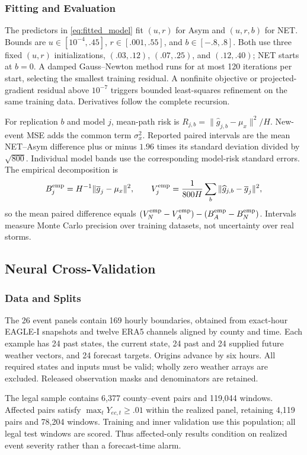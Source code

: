 \subsubsection{Fitting and Evaluation}
The predictors in \eqref{eq:fitted_model} fit $(u,r)$ for Asym and $(u,r,b)$ for NET. Bounds are $u\in[10^{-4},.45]$, $r\in[.001,.55]$, and $b\in[-.8,.8]$. Both use three fixed $(u,r)$ initializations, $(.03,.12)$, $(.07,.25)$, and $(.12,.40)$; NET starts at $b=0$. A damped Gauss--Newton method runs for at most 120 iterations per start, selecting the smallest training residual. A nonfinite objective or projected-gradient residual above $10^{-7}$ triggers bounded least-squares refinement on the same training data. Derivatives follow the complete recursion.

For replication $b$ and model $j$, mean-path risk is $R_{j,b}=\|\widehat g_{j,b}-\mu_x\|^2/H$. New-event MSE adds the common term $\sigma_x^2$. Reported paired intervals are the mean NET--Asym difference plus or minus $1.96$ times its standard deviation divided by $\sqrt{800}$. Individual model bands use the corresponding model-risk standard errors. The empirical decomposition is
\[
 B_j^{\rm emp}=H^{-1}\|\overline g_j-\mu_x\|^2,
 \qquad
 V_j^{\rm emp}=\frac1{800H}\sum_b\|\widehat g_{j,b}-\overline g_j\|^2,
\]
so the mean paired difference equals $(V_N^{\rm emp}-V_A^{\rm emp})-(B_A^{\rm emp}-B_N^{\rm emp})$. Intervals measure Monte Carlo precision over training datasets, not uncertainty over real storms.

\subsection{Neural Cross-Validation}\label{app:neural_contract}\label{app:real}
\subsubsection{Data and Splits}
The 26 event panels contain 169 hourly boundaries, obtained from exact-hour EAGLE-I snapshots and twelve ERA5 channels aligned by county and time. Each example has 24 past states, the current state, 24 past and 24 supplied future weather vectors, and 24 forecast targets. Origins advance by six hours. All required states and inputs must be valid; wholly zero weather arrays are excluded. Released observation masks and denominators are retained.

The legal sample contains 6,377 county--event pairs and 119,044 windows. Affected pairs satisfy $\max_tY_{ec,t}\ge .01$ within the realized panel, retaining 4,119 pairs and 78,204 windows. Training and inner validation use this population; all legal test windows are scored. Thus affected-only results condition on realized event severity rather than a forecast-time alarm.

